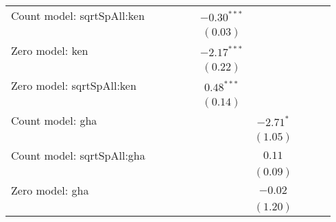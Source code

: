 \begin{table}
\begin{center}
{\begin{tabular}{l c c c c c c c c c}
Count model: sqrtSpAll:ken     &               &               &               &                 & $-0.30^{***}$ &                 &                 &               &               \\
                               &               &               &               &                 & $(0.03)$      &                 &                 &               &               \\
Zero model: ken                &               &               &               &                 & $-2.17^{***}$ &                 &                 &               &               \\
                               &               &               &               &                 & $(0.22)$      &                 &                 &               &               \\
Zero model: sqrtSpAll:ken      &               &               &               &                 & $0.48^{***}$  &                 &                 &               &               \\
                               &               &               &               &                 & $(0.14)$      &                 &                 &               &               \\
Count model: gha               &               &               &               &                 &               & $-2.71^{*}$     &                 &               &               \\
                               &               &               &               &                 &               & $(1.05)$        &                 &               &               \\
Count model: sqrtSpAll:gha     &               &               &               &                 &               & $0.11$          &                 &               &               \\
                               &               &               &               &                 &               & $(0.09)$        &                 &               &               \\
Zero model: gha                &               &               &               &                 &               & $-0.02$         &                 &               &               \\
                               &               &               &               &                 &               & $(1.20)$        &                 &               &               \\

\end{tabular}}
\end{center}
\end{table}
